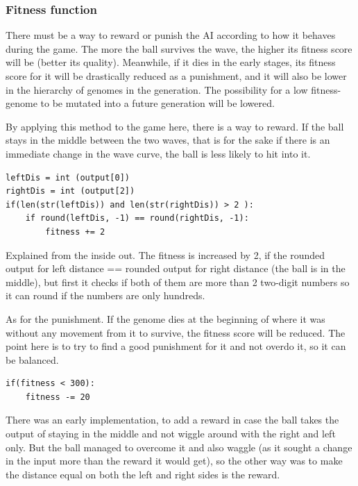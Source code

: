 \subsubsection{Fitness function}
There must be a way to reward or punish the AI according to how it behaves during the game. The more the ball survives the wave, the higher its fitness score will be (better its quality). Meanwhile, if it dies in the early stages, its fitness score for it will be drastically reduced as a punishment, and it will also be lower in the hierarchy of genomes in the generation. The possibility for a low fitness-genome to be mutated into a future generation will be lowered.

By applying this method to the game here, there is a way to reward. If the ball stays in the middle between the two waves, that is for the sake if there is an immediate change in the wave curve, the ball is less likely to hit into it.

\begin{listing}[H]
\begin{verbatim}
leftDis = int (output[0])
rightDis = int (output[2])
if(len(str(leftDis)) and len(str(rightDis)) > 2 ):
	if round(leftDis, -1) == round(rightDis, -1):
		fitness += 2
\end{verbatim}
\end{listing}

Explained from the inside out. The fitness is increased by 2, if the rounded output for left distance == rounded output for right distance (the ball is in the middle), but first it checks if both of them are more than 2 two-digit numbers so it can round if the numbers are only hundreds.

As for the punishment. If the genome dies at the beginning of where it was without any movement from it to survive, the fitness score will be reduced. The point here is to try to find a good punishment for it and not overdo it, so it can be balanced.

\begin{listing}[H]
	\begin{verbatim}
if(fitness < 300):
	fitness -= 20
	\end{verbatim}
\end{listing}

There was an early implementation, to add a reward in case the ball takes the output of staying in the middle and not wiggle around with the right and left only. But the ball managed to overcome it and also waggle (as it sought a change in the input more than the reward it would get), so the other way was to make the distance equal on both the left and right sides is the reward.

